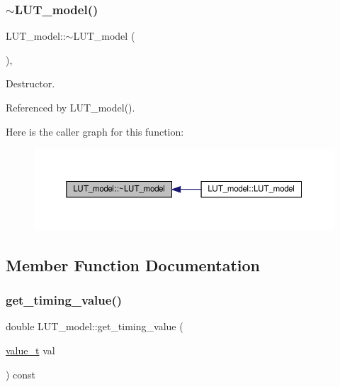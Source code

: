 \subsubsection{\texorpdfstring{$\sim$\+L\+U\+T\+\_\+model()}{~LUT\_model()}}
{\footnotesize\ttfamily L\+U\+T\+\_\+model\+::$\sim$\+L\+U\+T\+\_\+model (\begin{DoxyParamCaption}{ }\end{DoxyParamCaption})\hspace{0.3cm}{\ttfamily [override]}, {\ttfamily [default]}}



Destructor. 



Referenced by L\+U\+T\+\_\+model().

Here is the caller graph for this function\+:
\nopagebreak
\begin{figure}[H]
\begin{center}
\leavevmode
\includegraphics[width=350pt]{dd/da2/classLUT__model_a2c3cebbb4524c36b95d954cc2f774eaf_icgraph}
\end{center}
\end{figure}


\subsection{Member Function Documentation}
\mbox{\label{classLUT__model_a36109f570f043a338845fe6a4ab29e87}} 
\subsubsection{\texorpdfstring{get\+\_\+timing\+\_\+value()}{get\_timing\_value()}}
{\footnotesize\ttfamily double L\+U\+T\+\_\+model\+::get\+\_\+timing\+\_\+value (\begin{DoxyParamCaption}\item[{\hyperlink{classLUT__model_a863cc03b53b14df7344ada5a1bed2b20}{value\+\_\+t}}]{val }\end{DoxyParamCaption}) const}



